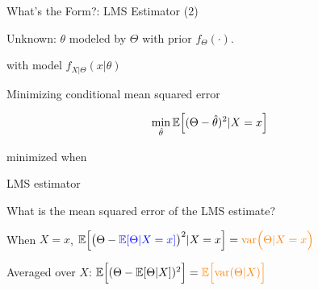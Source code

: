 \begin{frame}{What's the Form?: LMS Estimator (2) }

\plitemsep 0.1in
\bci

\item<1-> Unknown: $\theta$ modeled by $\Theta$ with prior $f_{\Theta}(\cdot).$

\item<1->  with model $f_{X|\Theta}(x|\theta)$

\item<2-> Minimizing conditional mean squared error

$$
\min_{\hat{\theta}} \mathbb{E}\Bigl[ (\Theta - \hat{\theta})^2 | X=x \Bigr]
$$

\bci
\item<3-> minimized when 
\item<4->  LMS estimator 
\eci

\item<5-> What is the mean squared error of the LMS estimate?
\bci
\item<6-> When $X=x$, $\mathbb{E}\Bigl[ \big(\Theta - {\color{blue} \mathbb{E}[ \Theta | X=x ]} \big)^2 | X=x \Bigr] = {\color{orange} \text{var}\Bigl( \Theta | X=x \Bigr)}$
\item<7-> Averaged over $X$: $\mathbb{E}\Bigl[ (\Theta - \mathbb{E}[ \Theta | X ]
    )^2 \Bigr] =  {\color{orange} \mathbb{E}\Bigl[ \text{var}( \Theta | X ) \Bigr]}$
\eci



\eci

\end{frame}



